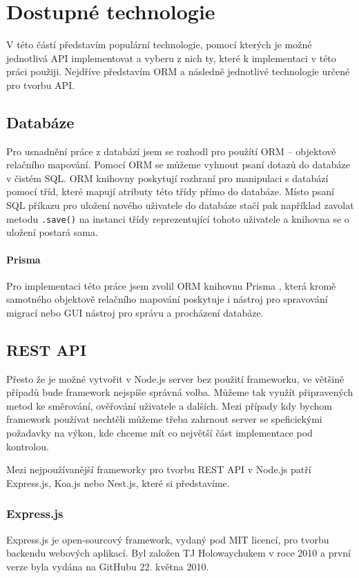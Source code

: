 \documentclass[thesis=M,czech]{FITthesis}[2019/12/23]
\begin{document}
\chapter{Dostupné technologie}
V této částí představím populární technologie, pomocí kterých je možné jednotlivá API implementovat a vyberu z nich ty, které k implementaci v této práci použiji. Nejdříve představím ORM a následně jednotlivé technologie určené pro tvorbu API.

\section{Databáze}
Pro usnadnění práce z databází jsem se rozhodl pro použítí ORM -- objektově relačního mapování. Pomocí ORM se můžeme vyhnout psaní dotazů do databáze v čistém SQL. ORM knihovny poskytují rozhraní pro manipulaci s databází pomocí tříd, které mapují atributy této třídy přímo do databáze. Místo psaní SQL příkazu pro uložení nového uživatele do databáze stačí pak například zavolat metodu \texttt{.save()} na instanci třídy reprezentující tohoto uživatele a knihovna se o uložení postará sama.

\subsubsection*{Prisma}
Pro implementaci této práce jsem zvolil ORM knihovnu Prisma \cite{prisma}, která kromě samotného objektově relačního mapování poskytuje i nástroj pro spravování migrací nebo GUI nástroj pro správu a procházení databáze.

\section{REST API}
Přesto že je možné vytvořit v Node.js server bez použití frameworku, ve většině případů bude framework nejspíše správná volba. Můžeme tak využít připravených metod ke směrování, ověřování uživatele a dalších. Mezi případy kdy bychom framework používat nechtěli můžeme třeba zahrnout server se speficickými požadavky na výkon, kde chceme mít co největší část implementace pod kontrolou.

Mezi nejpoužívanější frameworky pro tvorbu REST API v Node.js patří Express.js, Koa.js nebo Nest.js, které si představíme. %
\subsection*{Express.js}
Express.js je open-sourcový framework, vydaný pod MIT licencí, pro tvorbu backendu webových aplikací. Byl založen TJ Holowaychukem v roce 2010 a první verze byla vydána na GitHubu 22. května 2010. %
\end{document}
